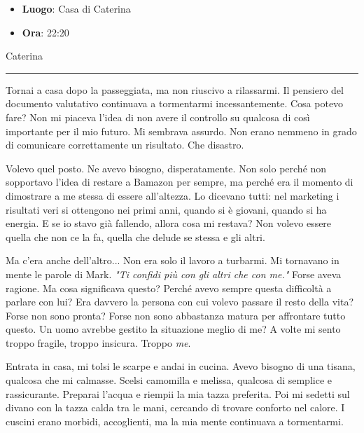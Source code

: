 \begin{tcolorbox}[colback=gray!5,colframe=gray!80,title=\textbf{Scheda Informativa}]
\begin{itemize}
    \item \textbf{Luogo}: Casa di Caterina
    \item \textbf{Ora}: 22:20
\end{itemize}
\end{tcolorbox}

\vspace{1em}
\begin{center}Caterina\end{center}
\hrule
\vspace{1em}

Tornai a casa dopo la passeggiata, ma non riuscivo a rilassarmi. Il pensiero del documento valutativo continuava a tormentarmi incessantemente. Cosa potevo fare? Non mi piaceva l'idea di non avere il controllo su qualcosa di così importante per il mio futuro. Mi sembrava assurdo. Non erano nemmeno in grado di comunicare correttamente un risultato. Che disastro.

Volevo quel posto. Ne avevo bisogno, disperatamente. Non solo perché non sopportavo l'idea di restare a Bamazon per sempre, ma perché era il momento di dimostrare a me stessa di essere all'altezza. Lo dicevano tutti: nel marketing i risultati veri si ottengono nei primi anni, quando si è giovani, quando si ha energia. E se io stavo già fallendo, allora cosa mi restava? Non volevo essere quella che non ce la fa, quella che delude se stessa e gli altri.

Ma c'era anche dell'altro... Non era solo il lavoro a turbarmi. Mi tornavano in mente le parole di Mark. \emph{"Ti confidi più con gli altri che con me."} Forse aveva ragione. Ma cosa significava questo? Perché avevo sempre questa difficoltà a parlare con lui? Era davvero la persona con cui volevo passare il resto della vita? Forse non sono  pronta? Forse non sono abbastanza matura per affrontare tutto questo. Un uomo avrebbe gestito la situazione meglio di me? A volte mi sento troppo fragile, troppo insicura. Troppo \emph{me}.

Entrata in casa, mi tolsi le scarpe e andai in cucina. Avevo bisogno di una tisana, qualcosa che mi calmasse. Scelsi camomilla e melissa, qualcosa di semplice e rassicurante. Preparai l'acqua e riempii la mia tazza preferita. Poi mi sedetti sul divano con la tazza calda tra le mani, cercando di trovare conforto nel calore. I cuscini erano morbidi, accoglienti, ma la mia mente continuava a tormentarmi.

